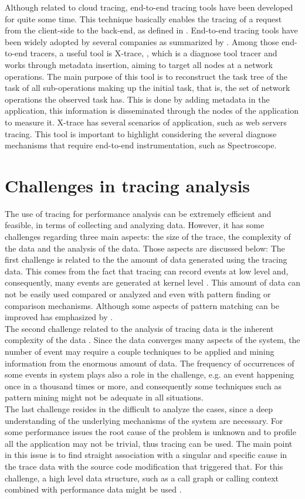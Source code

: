 Although related to cloud tracing, end-to-end tracing tools have been developed for quite some time. This technique basically enables the tracing of a request from the client-side to the back-end, as defined in \cite{sybase}. End-to-end tracing tools have been widely adopted by several companies as summarized by \cite{mace_list}.
Among those end-to-end tracers, a useful tool is X-trace, \cite{Fonseca2007XPN19734301973450}, which is a diagnose tool tracer and works through metadata insertion, aiming to target all nodes at a network operations. The main purpose of this tool is to reconstruct the task tree of the task of all sub-operations making up the initial task, that is, the set of network operations the observed task has. This is done by adding metadata in the application, this information is disseminated through the nodes of the application to measure it. X-trace has several scenarios of application, such as web servers tracing. This tool is important to highlight considering the several diagnose mechanisms that require end-to-end instrumentation, such as Spectroscope.\\
\section{Challenges in tracing analysis}
The use of tracing for performance analysis can be extremely efficient and feasible, in terms of collecting and analyzing data. However, it has some challenges regarding three main aspects: the size of the trace, the complexity of the data and the analysis of the data. Those aspects are discussed below:
The first challenge is related to the the amount of data generated using the tracing data. This comes from the fact that tracing can record events at low level and, consequently, many events are generated at kernel level \cite{giraldeau-ols2011}. This amount of data can not be easily used compared or analyzed and even with pattern finding or comparison mechanisms. Although some aspects of pattern matching can be improved has emphasized by \cite{similarity_based}.\\
The second challenge related to the analysis of tracing data is the inherent complexity of the data \cite{giraldeau-ols2011}. Since the data converges many aspects of the system, the number of event may require a couple techniques to be applied and mining information from the enormous amount of data. The frequency of occurrences of some events in system plays also a role in the challenge, e.g. an event happening once in a thousand times or more, and consequently some techniques such as pattern mining might not be adequate in all situations.\\
The last challenge resides in the difficult to analyze the cases, since a deep understanding of the underlying mechanisms of the system are necessary. For some performance issues the root cause of the problem is unknown and to profile all the application may not be trivial, thus tracing can be used. The main point in this issue is to find straight association with a singular and specific cause in the trace data with the source code modification that triggered that. For this challenge, a high level data structure, such as a call graph or calling context combined with performance data might be used \cite{doray_article}. 
